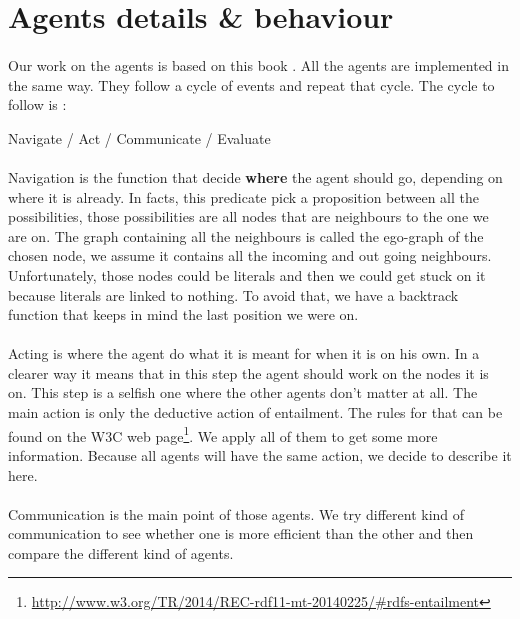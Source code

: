 \documentclass{article}
\begin{document}
\newpage
\section{Agents details \& behaviour}
	\paragraph{}
		Our work on the agents is based on this book \cite{Engelbrecht05}.
		All the agents are implemented in the same way.
		They follow a cycle of events and repeat that cycle.
		The cycle to follow is :
	\begin{center}
		Navigate / Act / Communicate / Evaluate
	\end{center}
	\paragraph{}
		Navigation is the function that decide \textbf{where} the agent should go, depending on where it is already.
		In facts, this predicate pick a proposition between all the possibilities,
		those possibilities are all nodes that are neighbours to the one we are on.
		The graph containing all the neighbours is called the ego-graph of the chosen node,
		we assume it contains all the incoming and out going neighbours.
		Unfortunately, those nodes could be literals and then we could get stuck on it because literals are linked to nothing.
		To avoid that, we have a backtrack function that keeps in mind the last position we were on.
	\paragraph{}
		Acting is where the agent do what it is meant for when it is on his own.
		In a clearer way it means that in this step the agent should work on the nodes it is on.
		This step is a selfish one where the other agents don't matter at all.
		The main action is only the deductive action of entailment.
		The rules for that can be found on the W3C web page\footnote{\url{http://www.w3.org/TR/2014/REC-rdf11-mt-20140225/\#rdfs-entailment}}.
		We apply all of them to get some more information.
		Because all agents will have the same action, we decide to describe it here.
	\paragraph{}
		Communication is the main point of those agents.
		We try different kind of communication to see whether one is more efficient than the other
		and then compare the different kind of agents.
\end{document}
